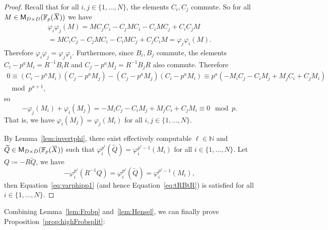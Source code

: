 \documentclass[letterpaper, 11pt, thm-restate]{article}
\numberwithin{equation}{section}
\newcommand{\N}{\mathbb{N}}
\newcommand{\F}{\mathbb{F}}
\newcommand{\M}{\mathsf{M}}
\newcommand{\oX}{\mkern 1.5mu\overline{\mkern-1.5mu X \mkern-1.5mu}\mkern 1.5mu}
\theoremstyle{definition}
\theoremstyle{definition}
\theoremstyle{definition}
\begin{document}
\begin{proof}
    Recall that for all $i, j \in \{1, \ldots, N\}$, the elements $C_i, C_j$ commute.
    So for all $M \in \M_{D \times D}(\F_p(\oX))$ we have
    \begin{multline*}
    \varphi_i \varphi_j (M) = M C_j C_i - C_jMC_i - C_iMC_j + C_iC_j M \\
    = M C_i C_j - C_jMC_i - C_iMC_j + C_jC_i M = \varphi_j \varphi_i (M).
    \end{multline*}
    Therefore $\varphi_i \varphi_j = \varphi_j \varphi_i$.
    Furthermore, since $B_i, B_j$ commute, the elements $C_i - p^a M_i = R^{-1} B_i R$ and $C_j - p^a M_j = R^{-1} B_j R$ also commute.
    Therefore
    \begin{multline*}
    0 \equiv (C_i - p^a M_i)(C_j - p^a M_j) - (C_j - p^a M_j)(C_i - p^a M_i) \equiv p^a(- M_i C_j - C_i M_j + M_j C_i + C_j M_i) \\
    \mod p^{a+1},
    \end{multline*}
    so
    \begin{equation}\label{eq:varMeq}
    - \varphi_j(M_i) + \varphi_i(M_j) = - M_i C_j - C_i M_j + M_j C_i + C_j M_i \equiv 0 \mod p.
    \end{equation}
    That is, we have $\varphi_i(M_j) = \varphi_j(M_i)$ for all $i, j \in \{1, \ldots, N\}$.
    
    By Lemma~\ref{lem:invertphi}, there exist effectively computable $\ell \in \N$ and $\widetilde{Q} \in \M_{D \times D}(\F_p(\oX))$ 
    such that $\varphi_i^{p^{\ell}}(\widetilde{Q}) = \varphi_i^{p^{\ell}-1}(M_i)$ for all $i \in \{1, \ldots, N\}$.
    Let $Q \coloneqq -R\widetilde{Q}$, we have
    \[
    - \varphi_i^{p^{\ell}}(R^{-1} Q) = \varphi_i^{p^{\ell}}(\widetilde{Q}) = \varphi_i^{p^{\ell}-1}(M_i),
    \]
    then Equation~\eqref{eq:varphipp1} (and hence Equation~\eqref{eq:tRBtR}) is satisfied for all $i \in \{1, \ldots, N\}$.
\end{proof}

Combining Lemma~\ref{lem:Frobp} and~\ref{lem:Hensel}, we can finally prove Proposition~\ref{prop:highFrobsplit}:
\end{document}
